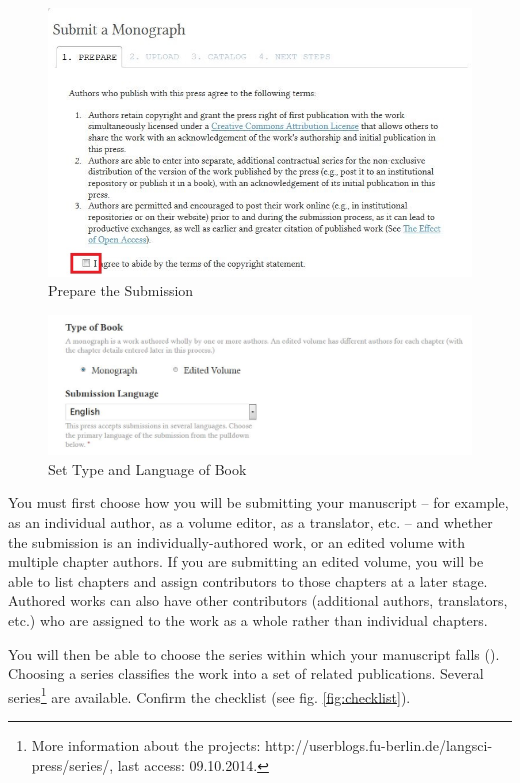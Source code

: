 \begin{figure}[h]
\centering
\includegraphics[width=1\textwidth]{./img/submission-1.jpg}
\caption{Prepare the Submission}
\label{fig:submission1}
\end{figure}

\begin{figure}[h]
\centering
\includegraphics[width=1\textwidth]{./img/submission-2.jpg}
\caption{Set Type and Language of Book}
\label{fig:submission2}
\end{figure}

You must first choose how you will be submitting your manuscript -- for example, as an individual author, as a volume editor, as a translator, etc. -- and whether the submission is an individually-authored work, or an edited volume with multiple chapter authors. If you are submitting an edited volume, you will be able to list chapters and assign contributors to those chapters at a later stage. Authored works can also have other contributors (additional authors, translators, etc.) who are assigned to the work as a whole rather than individual chapters.


You will then be able to choose the series within which your manuscript falls (). Choosing a series classifies the work into a set of related publications. Several series\footnote{More information about the projects: http://userblogs.fu-berlin.de/langsci-press/series/, last access: 09.10.2014.} are available. Confirm the checklist (see fig. \ref{fig:checklist}).

